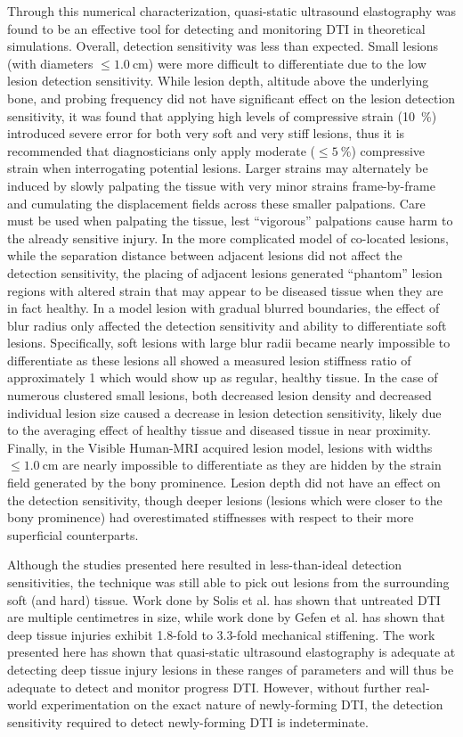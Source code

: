 		Through this numerical characterization, quasi-static ultrasound elastography was found to be an effective tool for detecting and monitoring DTI in theoretical simulations. Overall, detection sensitivity was less than expected. Small lesions (with diameters $\leq \SI{1.0}{\cm}$) were more difficult to differentiate due to the low lesion detection sensitivity. While lesion depth, altitude above the underlying bone, and probing frequency did not have significant effect on the lesion detection sensitivity, it was found that applying high levels of compressive strain (\SI{10}{\percent}) introduced severe error for both very soft and very stiff lesions, thus it is recommended that diagnosticians only apply moderate ($\leq \SI{5}{\percent}$) compressive strain when interrogating potential lesions. Larger strains may alternately be induced by slowly palpating the tissue with very minor strains frame-by-frame and cumulating the displacement fields across these smaller palpations. Care must be used when palpating the tissue, lest ``vigorous'' palpations cause harm to the already sensitive injury. In the more complicated model of co-located lesions, while the separation distance between adjacent lesions did not affect the detection sensitivity, the placing of adjacent lesions generated ``phantom'' lesion regions with altered strain that may appear to be diseased tissue when they are in fact healthy. In a model lesion with gradual blurred boundaries, the effect of blur radius only affected the detection sensitivity and ability to differentiate soft lesions. Specifically, soft lesions with large blur radii became nearly impossible to differentiate as these lesions all showed a measured lesion stiffness ratio of approximately 1 which would show up as regular, healthy tissue. In the case of numerous clustered small lesions, both decreased lesion density and decreased individual lesion size caused a decrease in lesion detection sensitivity, likely due to the averaging effect of healthy tissue and diseased tissue in near proximity. Finally, in the Visible Human-MRI acquired lesion model, lesions with widths $\leq \SI{1.0}{\cm}$ are nearly impossible to differentiate as they are hidden by the strain field generated by the bony prominence. Lesion depth did not have an effect on the detection sensitivity, though deeper lesions (lesions which were closer to the bony prominence) had overestimated stiffnesses with respect to their more superficial counterparts.

		Although the studies presented here resulted in less-than-ideal detection sensitivities, the technique was still able to pick out lesions from the surrounding soft (and hard) tissue. Work done by Solis et al. \cite{solis13} has shown that untreated DTI are multiple centimetres in size, while work done by Gefen et al. \cite{gefen05} has shown that deep tissue injuries exhibit 1.8-fold to 3.3-fold mechanical stiffening. The work presented here has shown that quasi-static ultrasound elastography is adequate at detecting deep tissue injury lesions in these ranges of parameters and will thus be adequate to detect and monitor progress DTI. However, without further real-world experimentation on the exact nature of newly-forming DTI, the detection sensitivity required to detect newly-forming DTI is indeterminate.

